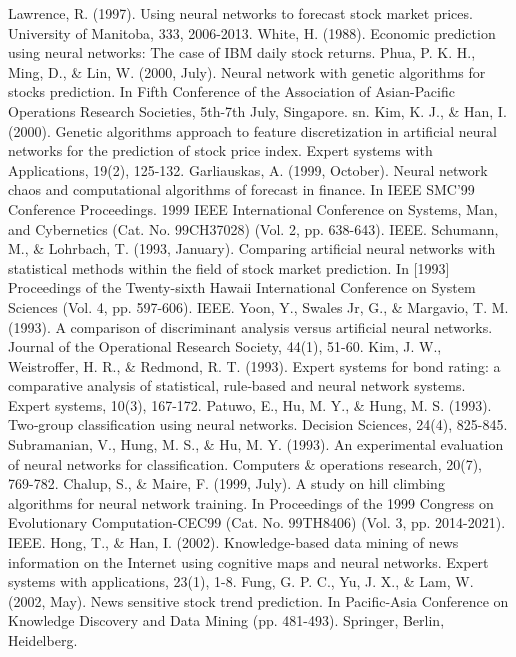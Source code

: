 \documentclass[a4paper,12pt]{report}
\begin{document}
\begin{fig}
%
%
\begin{thebibliography}{9}
	Lawrence, R. (1997). Using neural networks to forecast stock market prices. University of Manitoba, 333, 2006-2013.
	White, H. (1988). Economic prediction using neural networks: The case of IBM daily stock returns.
	Phua, P. K. H., Ming, D., \& Lin, W. (2000, July). Neural network with genetic algorithms for stocks prediction. In Fifth Conference of the Association of Asian-Pacific Operations Research Societies, 5th-7th July, Singapore. sn.
	Kim, K. J., \& Han, I. (2000). Genetic algorithms approach to feature discretization in artificial neural networks for the prediction of stock price index. Expert systems with Applications, 19(2), 125-132.
	Garliauskas, A. (1999, October). Neural network chaos and computational algorithms of forecast in finance. In IEEE SMC'99 Conference Proceedings. 1999 IEEE International Conference on Systems, Man, and Cybernetics (Cat. No. 99CH37028) (Vol. 2, pp. 638-643). IEEE.
	Schumann, M., \& Lohrbach, T. (1993, January). Comparing artificial neural networks with statistical methods within the field of stock market prediction. In [1993] Proceedings of the Twenty-sixth Hawaii International Conference on System Sciences (Vol. 4, pp. 597-606). IEEE.
	Yoon, Y., Swales Jr, G., \& Margavio, T. M. (1993). A comparison of discriminant analysis versus artificial neural networks. Journal of the Operational Research Society, 44(1), 51-60.
	Kim, J. W., Weistroffer, H. R., \& Redmond, R. T. (1993). Expert systems for bond rating: a comparative analysis of statistical, rule‐based and neural network systems. Expert systems, 10(3), 167-172.
	Patuwo, E., Hu, M. Y., \& Hung, M. S. (1993). Two‐group classification using neural networks. Decision Sciences, 24(4), 825-845.
	Subramanian, V., Hung, M. S., \& Hu, M. Y. (1993). An experimental evaluation of neural networks for classification. Computers \& operations research, 20(7), 769-782.
	Chalup, S., \& Maire, F. (1999, July). A study on hill climbing algorithms for neural network training. In Proceedings of the 1999 Congress on Evolutionary Computation-CEC99 (Cat. No. 99TH8406) (Vol. 3, pp. 2014-2021). IEEE.
	Hong, T., \& Han, I. (2002). Knowledge-based data mining of news information on the Internet using cognitive maps and neural networks. Expert systems with applications, 23(1), 1-8.
	Fung, G. P. C., Yu, J. X., \& Lam, W. (2002, May). News sensitive stock trend prediction. In Pacific-Asia Conference on Knowledge Discovery and Data Mining (pp. 481-493). Springer, Berlin, Heidelberg.

\end{thebibliography}
\end{fig}
\end{document}

